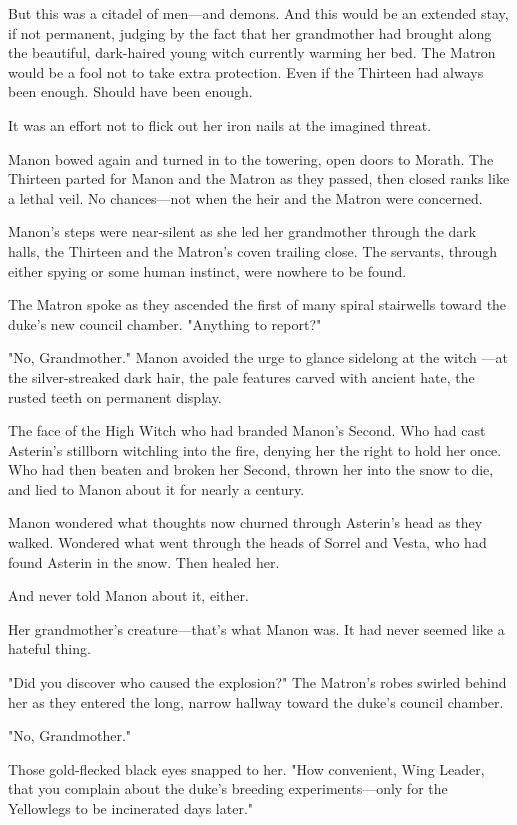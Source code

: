 But this was a citadel of men---and demons. And this would be an extended stay, if not permanent, judging by the fact that her grandmother had brought along the beautiful, dark-haired young witch currently warming her bed. The Matron would be a fool not to take extra protection. Even if the Thirteen had always been enough. Should have been enough.

It was an effort not to flick out her iron nails at the imagined threat.

Manon bowed again and turned in to the towering, open doors to Morath. The Thirteen parted for Manon and the Matron as they passed, then closed ranks like a lethal veil. No chances---not when the heir and the Matron were concerned.

Manon's steps were near-silent as she led her grandmother through the dark halls, the Thirteen and the Matron's coven trailing close. The servants, through either spying or some human instinct, were nowhere to be found.

The Matron spoke as they ascended the first of many spiral stairwells toward the duke's new council chamber. "Anything to report?"

"No, Grandmother." Manon avoided the urge to glance sidelong at the witch ---at the silver-streaked dark hair, the pale features carved with ancient hate, the rusted teeth on permanent display.

The face of the High Witch who had branded Manon's Second. Who had cast Asterin's stillborn witchling into the fire, denying her the right to hold her once. Who had then beaten and broken her Second, thrown her into the snow to die, and lied to Manon about it for nearly a century.

Manon wondered what thoughts now churned through Asterin's head as they walked. Wondered what went through the heads of Sorrel and Vesta, who had found Asterin in the snow. Then healed her.

And never told Manon about it, either.

Her grandmother's creature---that's what Manon was. It had never seemed like a hateful thing.

"Did you discover who caused the explosion?" The Matron's robes swirled behind her as they entered the long, narrow hallway toward the duke's council chamber.

"No, Grandmother."

Those gold-flecked black eyes snapped to her. "How convenient, Wing Leader, that you complain about the duke's breeding experiments---only for the Yellowlegs to be incinerated days later."

